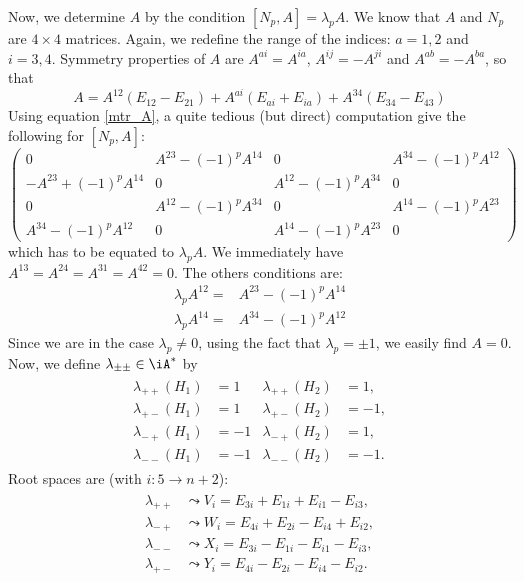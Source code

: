 Now, we determine $A$ by the condition $[N_p,A]=\lambda_pA$. We know that $A$ and $N_p$ are $4\times 4$ matrices. Again, we redefine the range of the indices: $a=1,2$ and $i=3,4$. Symmetry properties of $A$ are $A^{ai}=A^{ia}$, $A^{ij}=-A^{ji}$ and $A^{ab}=-A^{ba}$, so that
\[
 A=A^{12}(E_{12}-E_{21})+A^{ai}(E_{ai}+E_{ia})+A^{34}(E_{34}-E_{43})
\]
Using equation \eqref{mtr_A}, a quite tedious (but direct) computation give the following for $[N_p,A]$:
\begin{equation}\label{grosse_A}
\begin{pmatrix}
0&A^{23}-(-1)^p A^{14}&0&A^{34}-(-1)^p A^{12}\\
-A^{23}+(-1)^p A^{14}&0&A^{12}-(-1)^p A^{34}&0\\
0&A^{12}-(-1)^p A^{34}&0&A^{14}-(-1)^p A^{23}\\
A^{34}-(-1)^p A^{12}&0&A^{14}-(-1)^p A^{23}&0
\end{pmatrix}
\end{equation}
which has to be equated to $\lambda_pA$. We immediately have $A^{13}=A^{24}=A^{31}=A^{42}=0$. The others conditions are:
\begin{subequations}\label{pour_A}
\begin{align}
\lambda_pA^{12}=&A^{23}-(-1)^p A^{14}\\
\lambda_pA^{14}=&A^{34}-(-1)^p A^{12}
\end{align}
\end{subequations}
Since we are in the case $\lambda_p\neq 0$, using the fact that $\lambda_p=\pm 1$, we easily find $A=0$. Now, we define $\lambda_{\pm\pm}\in\iA^*$ by
\begin{eqnarray}
\begin{aligned}
\lambda_{++}(H_1)&=1 &\lambda_{++}(H_2)&=1,\\
\lambda_{+-}(H_1)&=1 &\lambda_{+-}(H_2)&=-1,\\
\lambda_{-+}(H_1)&=-1 &\lambda_{-+}(H_2)&=1,\\
\lambda_{--}(H_1)&=-1 &\lambda_{--}(H_2)&=-1.
\end{aligned}
\end{eqnarray}
Root spaces are (with $i:5\rightarrow n+2$):
\begin{eqnarray}
\begin{aligned}
\lambda_{++}&\leadsto V_i=E_{3i}+E_{1i}+E_{i1}-E_{i3},\\
\lambda_{-+}&\leadsto W_i=E_{4i}+E_{2i}-E_{i4}+E_{i2},\\
\lambda_{--}&\leadsto X_i=E_{3i}-E_{1i}-E_{i1}-E_{i3},\\
\lambda_{+-}&\leadsto Y_i=E_{4i}-E_{2i}-E_{i4}-E_{i2}.
\end{aligned}
\end{eqnarray}

